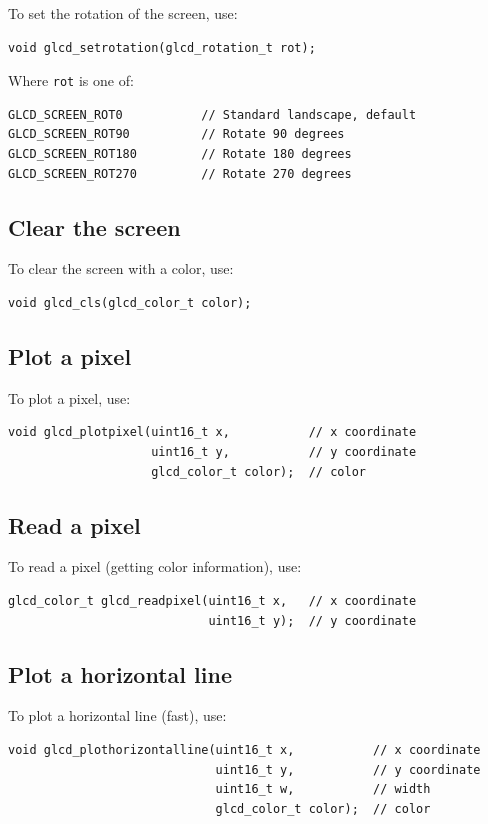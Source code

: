 \documentclass[12pt]{article}
\begin{document}
To set the rotation of the screen, use:
\begin{lstlisting}
void glcd_setrotation(glcd_rotation_t rot);
\end{lstlisting}

Where \lstinline|rot| is one of:

\begin{lstlisting}
GLCD_SCREEN_ROT0           // Standard landscape, default
GLCD_SCREEN_ROT90          // Rotate 90 degrees
GLCD_SCREEN_ROT180         // Rotate 180 degrees
GLCD_SCREEN_ROT270         // Rotate 270 degrees
\end{lstlisting}

\subsection{Clear the screen}
To clear the screen with a color, use:
\begin{lstlisting}
void glcd_cls(glcd_color_t color);
\end{lstlisting}

\subsection{Plot a pixel}
To plot a pixel, use:
\begin{lstlisting}
void glcd_plotpixel(uint16_t x,           // x coordinate
                    uint16_t y,           // y coordinate
                    glcd_color_t color);  // color
\end{lstlisting}

\subsection{Read a pixel}
To read a pixel (getting color information), use:

\begin{lstlisting}
glcd_color_t glcd_readpixel(uint16_t x,   // x coordinate
                            uint16_t y);  // y coordinate
\end{lstlisting}

\subsection{Plot a horizontal line}
To plot a horizontal line (fast), use:
\begin{lstlisting}
void glcd_plothorizontalline(uint16_t x,           // x coordinate
                             uint16_t y,           // y coordinate
                             uint16_t w,           // width
                             glcd_color_t color);  // color
\end{lstlisting}
\end{document}
